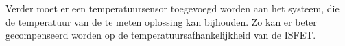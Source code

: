 Verder moet er een temperatuursensor toegevoegd worden aan het systeem, die de temperatuur van de te meten oplossing kan bijhouden. Zo kan er beter gecompenseerd worden op de temperatuursafhankelijkheid van de ISFET.





